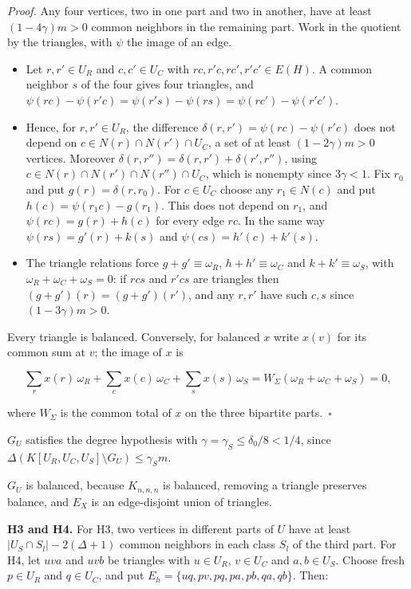 \documentclass[english,11pt,a4paper]{article}
\providecommand{\tightlist}{\setlength{\itemsep}{0pt}\setlength{\parskip}{0pt}}
\newcounter{none}
\begin{document}
\emph{Proof.} Any four vertices, two in one part and two in another, have at least \((1-4\gamma)m>0\) common neighbors in the remaining part. Work in the quotient by the triangles, with \(\psi\) the image of an edge.

\begin{itemize}
\tightlist
\item
  Let \(r,r'\in U_R\) and \(c,c'\in U_C\) with \(rc,r'c,rc',r'c'\in E(H)\). A common neighbor \(s\) of the four gives four triangles, and \(\psi(rc)-\psi(r'c)=\psi(r's)-\psi(rs)=\psi(rc')-\psi(r'c')\).
\item
  Hence, for \(r,r'\in U_R\), the difference \(\delta(r,r')=\psi(rc)-\psi(r'c)\) does not depend on \(c\in N(r)\cap N(r')\cap U_C\), a set of at least \((1-2\gamma)m>0\) vertices. Moreover \(\delta(r,r'')=\delta(r,r')+\delta(r',r'')\), using \(c\in N(r)\cap N(r')\cap N(r'')\cap U_C\), which is nonempty since \(3\gamma<1\). Fix \(r_0\) and put \(g(r)=\delta(r,r_0)\). For \(c\in U_C\) choose any \(r_1\in N(c)\) and put \(h(c)=\psi(r_1c)-g(r_1)\). This does not depend on \(r_1\), and \(\psi(rc)=g(r)+h(c)\) for every edge \(rc\). In the same way \(\psi(rs)=g'(r)+k(s)\) and \(\psi(cs)=h'(c)+k'(s)\).
\item
  The triangle relations force \(g+g'\equiv\omega_R\), \(h+h'\equiv\omega_C\) and \(k+k'\equiv\omega_S\), with \(\omega_R+\omega_C+\omega_S=0\): if \(rcs\) and \(r'cs\) are triangles then \((g+g')(r)=(g+g')(r')\), and any \(r,r'\) have such \(c,s\) since \((1-3\gamma)m>0\).
\end{itemize}

Every triangle is balanced. Conversely, for balanced \(x\) write \(x(v)\) for its common sum at \(v\); the image of \(x\) is

\nopagebreak[4]
\[\sum_r x(r)\,\omega_R+\sum_c x(c)\,\omega_C+\sum_s x(s)\,\omega_S=W_\Sigma(\omega_R+\omega_C+\omega_S)=0,\]

where \(W_\Sigma\) is the common total of \(x\) on the three bipartite parts.~\(\square\)

\(G_U\) satisfies the degree hypothesis with \(\gamma=\gamma_S\le\delta_0/8<1/4\), since \(\Delta(K[U_R,U_C,U_S]\setminus G_U)\le\gamma_Sm\).

\(G_U\) is balanced, because \(K_{n,n,n}\) is balanced, removing a triangle preserves balance, and \(E_X\) is an edge-disjoint union of triangles.

\textbf{H3 and H4.} For H3, two vertices in different parts of \(U\) have at least \(|U_S\cap S_l|-2(\Delta+1)\) common neighbors in each class \(S_l\) of the third part. For H4, let \(uva\) and \(uvb\) be triangles with \(u\in U_R\), \(v\in U_C\) and \(a,b\in U_S\). Choose fresh \(p\in U_R\) and \(q\in U_C\), and put \(E_h=\{uq,pv,pq,pa,pb,qa,qb\}\). Then:
\end{document}

